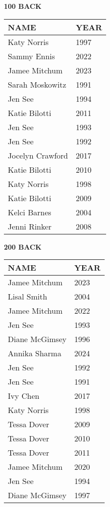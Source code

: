\begin{minipage}[t]{0.48\textwidth}
\centering
\textbf{100 BACK}\\[0.05cm]
\begin{tabular}{@{}p{2.8cm}p{1.2cm}@{}}
\hline
\textbf{NAME} & \textbf{YEAR} \\
\hline
Katy Norris & 1997 \\
Sammy Ennis & 2022 \\
Jamee Mitchum & 2023 \\
Sarah Moskowitz & 1991 \\
Jen See & 1994 \\
Katie Bilotti & 2011 \\
Jen See & 1993 \\
Jen See & 1992 \\
Jocelyn Crawford & 2017 \\
Katie Bilotti & 2010 \\
Katy Norris & 1998 \\
Katie Bilotti & 2009 \\
Kelci Barnes & 2004 \\
Jenni Rinker & 2008 \\
\hline
\end{tabular}
\end{minipage}\hfill
\begin{minipage}[t]{0.48\textwidth}
\centering
\textbf{200 BACK}\\[0.05cm]
\begin{tabular}{@{}p{2.8cm}p{1.2cm}@{}}
\hline
\textbf{NAME} & \textbf{YEAR} \\
\hline
Jamee Mitchum & 2023 \\
Lisal Smith & 2004 \\
Jamee Mitchum & 2022 \\
Jen See & 1993 \\
Diane McGimsey & 1996 \\
Annika Sharma & 2024 \\
Jen See & 1992 \\
Jen See & 1991 \\
Ivy Chen & 2017 \\
Katy Norris & 1998 \\
Tessa Dover & 2009 \\
Tessa Dover & 2010 \\
Tessa Dover & 2011 \\
Jamee Mitchum & 2020 \\
Jen See & 1994 \\
Diane McGimsey & 1997 \\
\hline
\end{tabular}
\end{minipage}

